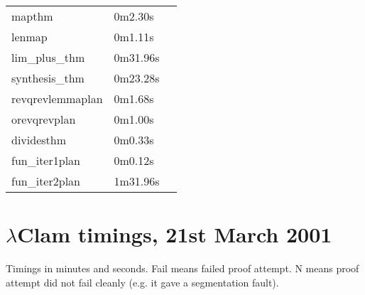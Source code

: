 \begin{center}
\begin{supertabular}[t]{llp{2in}}
mapthm & 0m2.30s & \\
lenmap & 0m1.11s & \\
lim\_plus\_thm & 0m31.96s & \\
synthesis\_thm & 0m23.28s & \\
revqrevlemmaplan & 0m1.68s & \\
orevqrevplan & 0m1.00s & \\
dividesthm & 0m0.33s & \\
fun\_iter1plan & 0m0.12s & \\
fun\_iter2plan & 1m31.96s & \\
\end{supertabular}\end{center}

\section{$\lambda$Clam timings, 21st March 2001}
Timings in minutes and seconds. Fail means failed proof attempt. N means proof attempt did not fail cleanly (e.g. it gave a segmentation fault).

